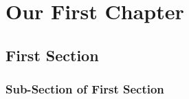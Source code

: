 \documentclass[12pt]{report}
\begin{document}
\chapter{Our First Chapter}
\lipsum[5-9]
\section{First Section}
\lipsum[3]
\subsection{Sub-Section of First Section}
\lipsum[4]	
\end{document}
